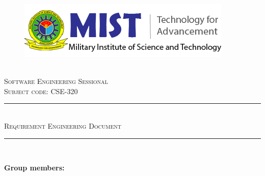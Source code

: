 \documentclass[12pt]{article}
\newcommand{\HRule}{\rule{\linewidth}{0.5mm}} %
\begin{document}
\begin{center}
    \begin{figure}
        \centering
        \includegraphics[width=0.75\linewidth]{logo.png}
        \label{fig:enter-label}
    \end{figure}
    \mbox{}\\[2.0cm]
    \textsc{\Huge Software Engineering Sessional}\\[2.5cm]
    \textsc{\Large Subject code: CSE-320}\\[2.0cm]
    
    \HRule\\[0.4cm]
    \textsc{\LARGE Requirement Engineering Document}\\
    \HRule\\[0.4cm]
\end{center}

\begin{flushleft}
    \textbf{\large Group members:}
\end{flushleft}
\end{document}
